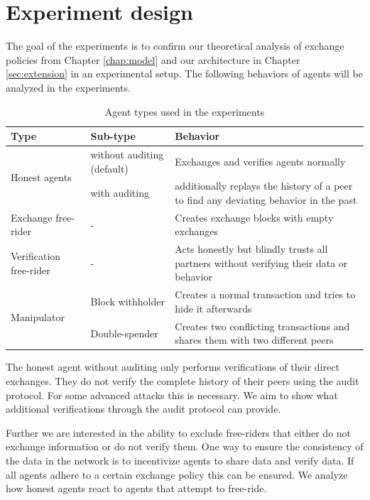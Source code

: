 \section{Experiment design}
The goal of the experiments is to confirm our theoretical analysis of exchange policies from Chapter 
\ref{chap:model} and our architecture in Chapter \ref{sec:extension} in an experimental setup.
The following behaviors of agents will be analyzed in the experiments.

\begin{table}
    \caption{Agent types used in the experiments}
    \label{tab:agent_types}
    \begin{tabular}{p{4.0cm}|p{2.8cm}|p{7.6cm}} \toprule
    \textbf{Type} & \textbf{Sub-type} & \textbf{Behavior} \\ \midrule
    \multirow{2}{3cm}{Honest agents} & without auditing (default) & Exchanges and verifies agents normally \\ \cline{2-3}
    & with auditing & additionally replays the history of a peer to find any deviating behavior in the past \\ \midrule
    Exchange free-rider & - & Creates exchange blocks with empty exchanges \\ 
    \midrule
    Verification free-rider & - & Acts honestly but blindly trusts all partners without verifying their data or behavior \\ \midrule
    \multirow{2}{3cm}{Manipulator } & Block withholder & Creates a normal transaction and tries to hide it afterwards \\ \cline{2-3}
    & Double-spender & Creates two conflicting transactions and shares them with two different peers \\ \bottomrule
    \end{tabular}
\end{table}

The honest agent without auditing only performs verifications of their direct exchanges. They do not
verify the complete history of their peers using the audit protocol. For some advanced attacks this
is necessary. We aim to show what additional verifications through the audit protocol can provide. 

Further we are interested in the ability to exclude free-riders that either do not exchange 
information or do not verify them. One way to ensure the consistency of the data in the network is 
to incentivize agents to share data and verify data. If all agents adhere to a certain exchange policy
this can be ensured. We analyze how honest agents react to agents that attempt to free-ride.

